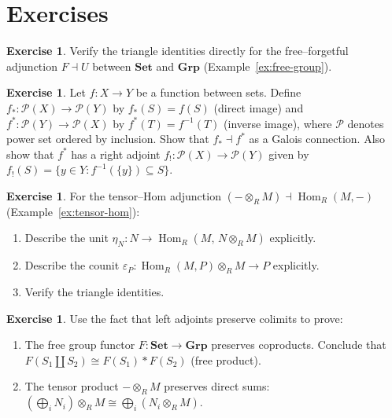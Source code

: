 \documentclass[a4paper,12pt]{book}
\DeclareMathOperator{\Hom}{Hom}
\newcommand{\Set}{\mathbf{Set}}
\newcommand{\Grp}{\mathbf{Grp}}
\theoremstyle{definition}
\newtheorem{exercise}[definition]{Exercise}
\theoremstyle{plain}
\theoremstyle{remark}
\begin{document}
\section{Exercises}\label{sec:exercises-ch4}

\begin{exercise}\label{exer:adj-check-triangle}
Verify the triangle identities directly for the free--forgetful adjunction
$F\dashv U$ between $\Set$ and $\Grp$ (Example~\ref{ex:free-group}).
\end{exercise}

\begin{exercise}\label{exer:adj-poset}
Let $f\colon X\to Y$ be a function between sets.  Define
$f_*\colon\mathcal{P}(X)\to\mathcal{P}(Y)$ by $f_*(S)=f(S)$
(direct image) and $f^*\colon\mathcal{P}(Y)\to\mathcal{P}(X)$
by $f^*(T)=f^{-1}(T)$ (inverse image), where $\mathcal{P}$ denotes
power set ordered by inclusion.
Show that $f_*\dashv f^*$ as a Galois connection.
Also show that $f^*$ has a right adjoint $f_!\colon\mathcal{P}(X)\to\mathcal{P}(Y)$
given by $f_!(S) = \{y\in Y : f^{-1}(\{y\})\subseteq S\}$.
\end{exercise}

\begin{exercise}\label{exer:adj-tensor-hom-triangle}
For the tensor--Hom adjunction $(-\otimes_R M)\dashv\Hom_R(M,-)$
(Example~\ref{ex:tensor-hom}):
\begin{enumerate}[label=(\alph*)]
\item Describe the unit $\eta_N\colon N\to\Hom_R(M,\,N\otimes_R M)$
    explicitly.
\item Describe the counit
    $\varepsilon_P\colon\Hom_R(M,P)\otimes_R M\to P$ explicitly.
\item Verify the triangle identities.
\end{enumerate}
\end{exercise}

\begin{exercise}\label{exer:ladj-preserves-colim-examples}
Use the fact that left adjoints preserve colimits to prove:
\begin{enumerate}[label=(\alph*)]
\item The free group functor $F\colon\Set\to\Grp$ preserves coproducts.
    Conclude that $F(S_1\amalg S_2)\cong F(S_1)*F(S_2)$ (free product).
\item The tensor product $-\otimes_R M$ preserves direct sums:
    $(\bigoplus_i N_i)\otimes_R M \cong \bigoplus_i(N_i\otimes_R M)$.
\end{enumerate}
\end{exercise}
\end{document}
